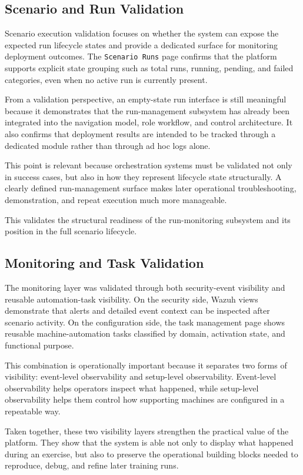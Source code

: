 \subsection{Scenario and Run Validation}
Scenario execution validation focuses on whether the system can expose the expected run lifecycle states and provide a dedicated surface for monitoring deployment outcomes. The \texttt{Scenario Runs} page confirms that the platform supports explicit state grouping such as total runs, running, pending, and failed categories, even when no active run is currently present.

From a validation perspective, an empty-state run interface is still meaningful because it demonstrates that the run-management subsystem has already been integrated into the navigation model, role workflow, and control architecture. It also confirms that deployment results are intended to be tracked through a dedicated module rather than through ad hoc logs alone.

This point is relevant because orchestration systems must be validated not only in success cases, but also in how they represent lifecycle state structurally. A clearly defined run-management surface makes later operational troubleshooting, demonstration, and repeat execution much more manageable.


This validates the structural readiness of the run-monitoring subsystem and its position in the full scenario lifecycle.

\subsection{Monitoring and Task Validation}
The monitoring layer was validated through both security-event visibility and reusable automation-task visibility. On the security side, Wazuh views demonstrate that alerts and detailed event context can be inspected after scenario activity. On the configuration side, the task management page shows reusable machine-automation tasks classified by domain, activation state, and functional purpose.

This combination is operationally important because it separates two forms of visibility: event-level observability and setup-level observability. Event-level observability helps operators inspect what happened, while setup-level observability helps them control how supporting machines are configured in a repeatable way.

Taken together, these two visibility layers strengthen the practical value of the platform. They show that the system is able not only to display what happened during an exercise, but also to preserve the operational building blocks needed to reproduce, debug, and refine later training runs.





